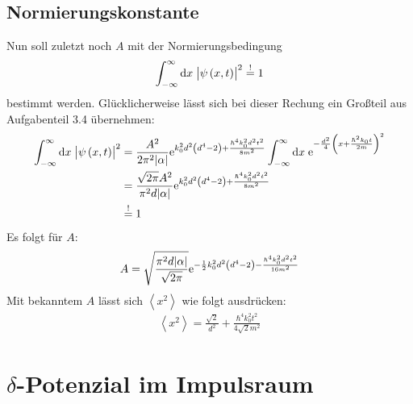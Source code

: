 \subsection{Normierungskonstante}
Nun soll zuletzt noch $A$ mit der Normierungsbedingung 
\[
	\int_{-\infty}^{\infty}\dif x\;\abs{\psi\del{x,t}}^2\overset{!}{=}1
\]
bestimmt werden. Glücklicherweise lässt sich bei dieser Rechung ein Großteil aus Aufgabenteil 3.4 übernehmen:
\begin{align*}
	\int_{-\infty}^{\infty}\dif x\;\abs{\psi\del{x,t}}^2&=\frac{A^2}{2\pi^2\abs{\alpha}}\ee^{k_0^2d^2\del{d^4-2}+\frac{\hbar^4k_0^2d^2t^2}{8m^2}}
	\int_{-\infty}^{\infty}\dif x\;\ee^{-\frac{d^2}{4}\del{x+\frac{\hbar^2k_0t}{2m}}^2}\\
	&=\frac{\sqrt{2\pi}A^2}{\pi^2d\abs{\alpha}}\ee^{k_0^2d^2\del{d^4-2}+\frac{\hbar^4k_0^2d^2t^2}{8m^2}}\\
	&\overset{!}{=}1
\end{align*}
Es folgt für $A$:
\begin{align*}
	A=\sqrt{\frac{\pi^2d\abs{\alpha}}{\sqrt{2\pi}}}\ee^{-\half k_0^2d^2\del{d^4-2}-\frac{\hbar^4k_0^2d^2t^2}{16m^2}}
\end{align*}
Mit bekanntem $A$ lässt sich $\left<x^2\right>$ wie folgt ausdrücken:
\begin{align*}
	\left<x^2\right>=\frac{\sqrt{2}}{d^2}+\frac{\hbar^4k_0^2t^2}{4\sqrt{2}m^2}
\end{align*}







\section{$\delta$-Potenzial im Impulsraum}


